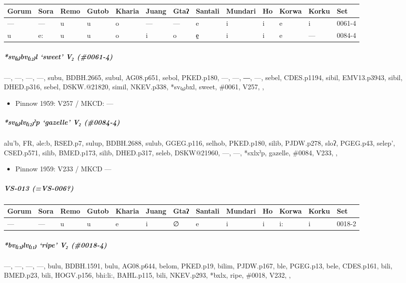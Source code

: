 \documentclass[a4paper,]{article}
\providecommand{\tightlist}{%
  \setlength{\itemsep}{0pt}\setlength{\parskip}{0pt}}
\let\oldsubparagraph\subparagraph
\renewcommand{\subparagraph}[1]{\oldsubparagraph{#1}\mbox{}}
\begin{document}
\begin{longtable}[]{@{}lllllllllllll@{}}
\toprule
Gorum & Sora & Remo & Gutob & Kharia & Juang & Gtaʔ & Santali & Mundari
& Ho & Korwa & Korku & Set\tabularnewline
\midrule
\endhead
--- & --- & u & u & o & --- & --- & e & i & i & e & i &
0061-4\tabularnewline
u & e: & u & u & o & i & o & e̠ & i & i & e & --- & 0084-4\tabularnewline
\bottomrule
\end{longtable}

\subparagraph{\texorpdfstring{\emph{*sv₍₆₎bv₍₁₂₎l} `sweet' V₂
(\#0061-4)}{*sv₍₆₎bv₍₁₂₎l sweet V₂ (\#0061-4)}}\label{svbvl-sweet-v-0061-4}

---, ---, ---, ---, subu, BDBH.2665, subul, AG08.p651, sebol, PKED.p180,
---, ---, ―, ---, sebel, CDES.p1194, sibil, EMV13.p3943, sibil,
DHED.p316, sebel, DSKW.@21820, simil, NKEV.p338, *sv₍₆₎bxl, sweet,
\#0061, V257, ,

\begin{itemize}
\tightlist
\item
  Pinnow 1959: V257 / MKCD: ---
\end{itemize}

\subparagraph{\texorpdfstring{\emph{*sv₍₆₎lv₍₁₂₎ˀp} `gazelle' V₂
(\#0084-4)}{*sv₍₆₎lv₍₁₂₎ˀp gazelle V₂ (\#0084-4)}}\label{svlvux2c0p-gazelle-v-0084-4}

alu'b, FR, əle:b, RSED.p7, sulup, BDBH.2688, sulub, GGEG.p116, selhob,
PKED.p180, silib, PJDW.p278, sloʔ, PGEG.p43, selep', CSED.p571, silib,
BMED.p173, silib, DHED.p317, seleb, DSKW@21960, ---, ---, *sxlxˀp,
gazelle, \#0084, V233, ,

\begin{itemize}
\tightlist
\item
  Pinnow 1959: V233 / MKCD ---
\end{itemize}

\subparagraph{VS-013 (=VS-006?)}\label{vs-013-vs-006}

\begin{longtable}[]{@{}lllllllllllll@{}}
\toprule
Gorum & Sora & Remo & Gutob & Kharia & Juang & Gtaʔ & Santali & Mundari
& Ho & Korwa & Korku & Set\tabularnewline
\midrule
\endhead
--- & --- & u & u & e & i & ∅ & e & i & i & i: & i &
0018-2\tabularnewline
\bottomrule
\end{longtable}

\subparagraph{\texorpdfstring{\emph{*bv₍₁₃₎lv₍₁₁₎} `ripe' V₂
(\#0018-4)}{*bv₍₁₃₎lv₍₁₁₎ ripe V₂ (\#0018-4)}}\label{bvlv-ripe-v-0018-4-1}

---, ---, ---, ---, bulu, BDBH.1591, bulu, AG08.p644, belom, PKED.p19,
bilim, PJDW.p167, ble, PGEG.p13, bele, CDES.p161, bili, BMED.p23, bili,
HOGV.p156, bhi:li:, BAHL.p115, bili, NKEV.p293, *bxlx, ripe, \#0018,
V232, ,
\end{document}
